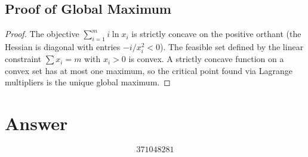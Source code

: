 \documentclass[12pt]{article}
\begin{document}
\subsection{Proof of Global Maximum}

\begin{proof}
The objective $\sum_{i=1}^m i \ln x_i$ is strictly concave on the positive orthant (the Hessian is diagonal with entries $-i/x_i^2 < 0$). The feasible set defined by the linear constraint $\sum x_i = m$ with $x_i > 0$ is convex. A strictly concave function on a convex set has at most one maximum, so the critical point found via Lagrange multipliers is the unique global maximum.
\end{proof}

\section{Answer}

\[
\boxed{371048281}
\]
\end{document}

